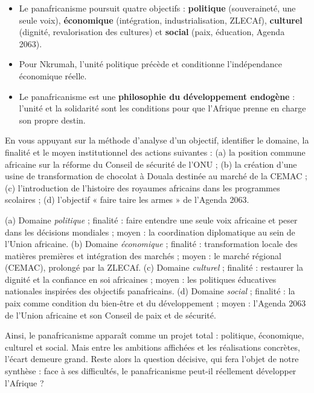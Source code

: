 \documentclass[11pt]{article}
\begin{document}
\begin{aretenir}
\begin{itemize}
\item Le panafricanisme poursuit quatre objectifs : \textbf{politique} (souveraineté, une seule voix), \textbf{économique} (intégration, industrialisation, ZLECAf), \textbf{culturel} (dignité, revalorisation des cultures) et \textbf{social} (paix, éducation, Agenda 2063).
\item Pour Nkrumah, l'unité politique précède et conditionne l'indépendance économique réelle.
\item Le panafricanisme est une \textbf{philosophie du développement endogène} : l'unité et la solidarité sont les conditions pour que l'Afrique prenne en charge son propre destin.
\end{itemize}
\end{aretenir}

\begin{exercice}
En vous appuyant sur la méthode d'analyse d'un objectif, identifier le domaine, la finalité et le moyen institutionnel des actions suivantes : (a) la position commune africaine sur la réforme du Conseil de sécurité de l'ONU ; (b) la création d'une usine de transformation de chocolat à Douala destinée au marché de la CEMAC ; (c) l'introduction de l'histoire des royaumes africains dans les programmes scolaires ; (d) l'objectif « faire taire les armes » de l'Agenda 2063.
\end{exercice}

\begin{corrige}[Exercice]
(a) Domaine \emph{politique} ; finalité : faire entendre une seule voix africaine et peser dans les décisions mondiales ; moyen : la coordination diplomatique au sein de l'Union africaine.
(b) Domaine \emph{économique} ; finalité : transformation locale des matières premières et intégration des marchés ; moyen : le marché régional (CEMAC), prolongé par la ZLECAf.
(c) Domaine \emph{culturel} ; finalité : restaurer la dignité et la confiance en soi africaines ; moyen : les politiques éducatives nationales inspirées des objectifs panafricains.
(d) Domaine \emph{social} ; finalité : la paix comme condition du bien-être et du développement ; moyen : l'Agenda 2063 de l'Union africaine et son Conseil de paix et de sécurité.
\end{corrige}

Ainsi, le panafricanisme apparaît comme un projet total : politique, économique, culturel et social. Mais entre les ambitions affichées et les réalisations concrètes, l'écart demeure grand. Reste alors la question décisive, qui fera l'objet de notre synthèse : face à ses difficultés, le panafricanisme peut-il réellement développer l'Afrique ?
\end{document}

